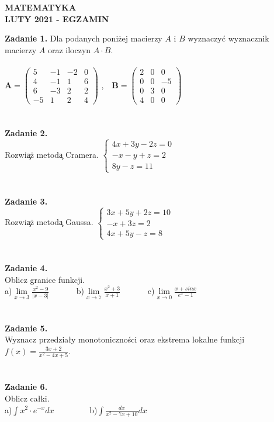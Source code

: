 \documentclass{report}
\begin{document}
\begin{center}
\textbf{MATEMATYKA \\LUTY 2021 - EGZAMIN}
\end{center}
\textbf{Zadanie 1.} 
Dla podanych poniżej macierzy $A$ i $B$ wyznaczyć wyznacznik macierzy $A$ oraz iloczyn $A\cdot B$.
\\\\
$
\mathbf{A} =
\left( \begin{array}{cccc}
5 & -1& -2 & 0\\
4 & -1&1 & 6\\
6 & -3& 2 & 2\\
-5 & 1 & 2 & 4 
\end{array} \right)
$ ,\ \ 
$
\mathbf{B} =
\left( \begin{array}{ccc}
2 & 0& 0\\
0 & 0& -5\\
0 & 3& 0\\
4 & 0& 0
\end{array} \right)
$
\\\\\\\textbf{Zadanie 2.} 
\\Rozwi\c{a}\.z metod\c{a} Cramera. 
$
\left\{ \begin{array}{ll}
4x+3y-2z=0\\
-x-y+z=2\\
8y-z=11
\end{array} \right.
$
\\\\\\\textbf{Zadanie 3.} 
\\Rozwi\c{a}\.z metod\c{a} Gaussa. 
$
\left\{ \begin{array}{ll}
3x+5y+2z=10\\
-x+3z=2\\
4x+5y-z=8
\end{array} \right.
$
\\\\\\\textbf{Zadanie 4.}
\\Oblicz granice funkcji.
\\a)$\lim\limits_{x\to 3}\frac{x^2-9}{\vert x-3\vert}$
\ \ \ \ \ \  b)$\lim\limits_{x\to 7}\frac{x^2+3}{x+1}$
\ \ \ \ \ \ c)$\lim\limits_{x\to 0} \frac{x+sinx}{e^x-1}$
\\\\\\\textbf{Zadanie 5.}
\\Wyznacz przedziały monotoniczności oraz ekstrema lokalne funkcji $f(x)=\frac{3x+2}{x^2-4x+5}$.
\\\\\\\textbf{Zadanie 6.}
\\Oblicz całki. 
\\a)$\int x^2\cdot e^{-x} dx$ \ \ \ \ \ \ \ \ b)$\int \frac{dx}{x^2-7x+10} dx$
\end{document}
